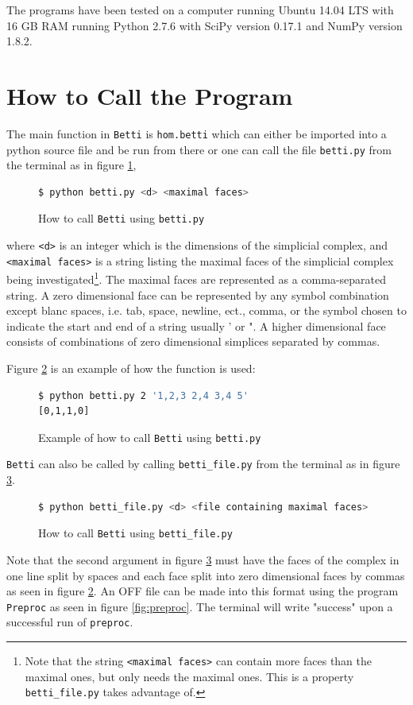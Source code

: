 \documentclass[11pt,a4paper,twoside]{report}
\begin{document}
The programs have been tested on a computer running Ubuntu 14.04 LTS with 16 GB RAM running Python 2.7.6 with SciPy version 0.17.1 and NumPy version 1.8.2.

\section{How to Call the Program} \label{ch:how2call}
The main function in \texttt{Betti} is \texttt{hom.betti} which can either be imported into a python source file and be run from there or one can call the file \texttt{betti.py} from the terminal as in figure \ref{fig:bettipseudo},
\begin{figure}[H]
\begin{lstlisting}[language=bash]
$ python betti.py <d> <maximal faces> 
\end{lstlisting}
\caption{How to call \texttt{Betti} using \texttt{betti.py}}
\label{fig:bettipseudo}
\end{figure}
where \texttt{<d>} is an integer which is the dimensions of the simplicial complex, and \texttt{<maximal faces>} is a string listing the maximal faces of the simplicial complex being investigated\footnote{Note that the string \texttt{<maximal faces>} can contain more faces than the maximal ones, but only needs the maximal ones. This is a property \texttt{betti\_file.py} takes advantage of.}. The maximal faces are represented as a comma-separated string. A zero dimensional face can be represented by any symbol combination except blanc spaces, i.e. tab, space, newline, ect., comma, or the symbol chosen to indicate the start and end of a string usually ' or ". A higher dimensional face consists of combinations of zero dimensional simplices separated by commas.

Figure \ref{fig:betti} is an example of how the function is used:
\begin{figure}[H]
\begin{lstlisting}[language=bash]
$ python betti.py 2 '1,2,3 2,4 3,4 5'
[0,1,1,0] 
\end{lstlisting}
\caption{Example of how to call \texttt{Betti} using \texttt{betti.py} }
\label{fig:betti}
\end{figure}

\texttt{Betti} can also be called by calling \texttt{betti\_file.py} from the terminal as in figure \ref{fig:bettifile}.
\begin{figure}[H]
\begin{lstlisting}[language=bash]
$ python betti_file.py <d> <file containing maximal faces> 
\end{lstlisting}
\caption{How to call \texttt{Betti} using \texttt{betti\_file.py}}
\label{fig:bettifile}
\end{figure}
Note that the second argument in figure \ref{fig:bettifile} must have the faces of the complex in one line split by spaces and each face split into zero dimensional faces by commas as seen in figure \ref{fig:betti}. An OFF file can be made into this format using the program \texttt{Preproc} as seen in figure \ref{fig:preproc}. The terminal will write "success" upon a successful run of \texttt{preproc}.
\end{document}

